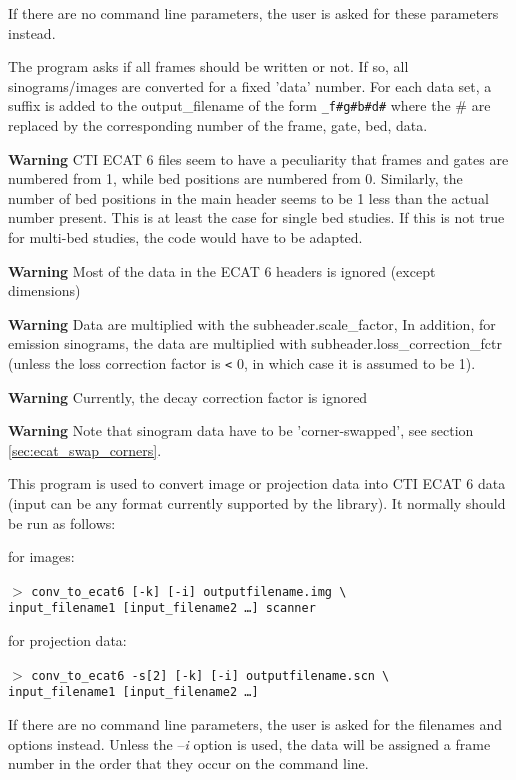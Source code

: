 \documentclass{article}
\newcommand{\cmdline}[1]{\par \noindent $>$ \texttt{#1}\par}
\begin{document}
If there are no command line parameters, the user is asked for 
these parameters instead. 


The program asks if all frames should be written or not. If so, 
all sinograms/images are converted for a fixed 'data' number. 
For each data set, a suffix is added to the output\_filename 
of the form \texttt{\_f\#g\#b\#d\#} where the \# are replaced 
by the corresponding number of the frame, gate, bed, data.



\textbf{Warning} CTI ECAT 6 files seem to have a peculiarity that 
frames and gates are numbered from 1, while bed positions are 
numbered from 0. Similarly, the number of bed positions in the 
main header seems to be 1 less than the actual number present. 
This is at least the case for single bed studies. If this is 
not true for multi-bed studies, the code would have to be adapted.


\textbf{Warning} Most of the data in the ECAT 6 headers is ignored 
(except dimensions)


\textbf{Warning} Data are multiplied with the subheader.scale\_factor, 
In addition, for emission sinograms, the data are multiplied 
with subheader.loss\_correction\_fctr (unless the loss correction 
factor is \texttt{<} 0, in which case it is assumed to be 1).


\textbf{Warning} Currently, the decay correction factor is ignored 

\textbf{Warning} Note that sinogram data have to be 'corner-swapped', 
see section \ref{sec:ecat_swap_corners}.

{ 
}

This program is used to convert image or projection data into 
CTI ECAT 6 data (input can be any format currently supported 
by the library). It normally should be run as follows:


for images:
\cmdline{conv\_to\_ecat6 [-k] [-i] outputfilename.img {\textbackslash}\\
input\_filename1 [input\_filename2 \dots ] scanner}


for projection data:
\cmdline{conv\_to\_ecat6 -s[2] [-k] [-i] outputfilename.scn {\textbackslash}\\
input\_filename1 [input\_filename2 \dots ]}


If there are no command line parameters, the user is asked for 
the filenames and options instead. Unless the --\textit{i} option is 
used, the data will be assigned a frame number in the order that 
they occur on the command line.
\end{document}

